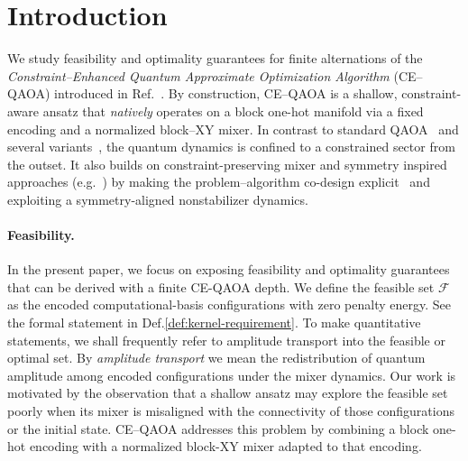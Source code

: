 \documentclass[a4paper,unpublished,onecolumn,11pt]{quantumarticle}
\theoremstyle{definition}
\theoremstyle{remark}
\begin{document}
\section{Introduction}
\label{sec:introduction}

We study feasibility and optimality guarantees for finite alternations of the
\emph{Constraint--Enhanced Quantum Approximate Optimization Algorithm} (CE--QAOA)
introduced in Ref.~\cite{onahce}. By construction, CE--QAOA is a shallow, constraint-aware ansatz that
\emph{natively} operates on a block one-hot manifold via a fixed encoding and a
normalized block--XY mixer. In contrast to standard QAOA~\cite{Farhi2014QAOA} and
several variants~\cite{montanezbarrera2024universalqaoa,BaeLee2024RecursiveQAOA,Finzgar2024QIRO},
the quantum dynamics is confined to a  constrained sector from the
outset. It also builds on constraint-preserving mixer and symmetry inspired approaches
(e.g.~\cite{Hadfield2019AOA,Fuchs2022ConstrainedMixers,tsvelikhovskiy2024symmetries})
by making the problem--algorithm co-design explicit~\cite{Tomesh2021QuantumCodesign}
and exploiting a symmetry-aligned nonstabilizer dynamics\cite{onahce,gopalstabilizer,BaertschiEidenbenz2019}.

\medskip\noindent

\paragraph{Feasibility.} In the present paper, we focus on exposing feasibility and optimality guarantees that can be derived with a finite CE-QAOA depth. We define the feasible set $\mathcal F$ as the encoded
computational-basis configurations with zero penalty energy. See the formal statement in Def.\ref{def:kernel-requirement}. To make quantitative statements, we shall frequently refer to amplitude transport into the feasible or optimal set.  By
\emph{amplitude transport} we mean the redistribution of quantum amplitude among encoded configurations under the mixer dynamics. Our work is motivated by the observation that a shallow ansatz may explore the feasible set poorly when its mixer is misaligned with the connectivity of those configurations or the initial state\cite{He2023A}. CE--QAOA addresses this problem by combining a block one-hot encoding with a normalized block-XY mixer adapted to that encoding. %
\end{document}

